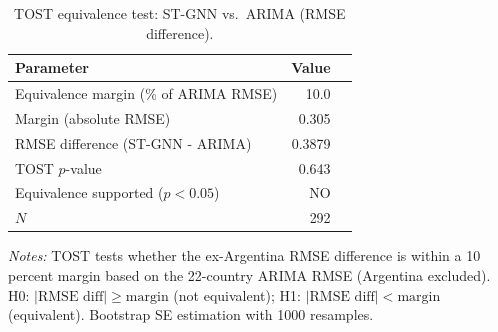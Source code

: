 \begin{table}[ht]
  \centering
  \caption{TOST equivalence test: ST-GNN vs.\ ARIMA (RMSE difference).}
  \label{tab:tost}
  \begin{tabular}{lrr}
    \toprule
    Parameter & Value \\
    \midrule
    Equivalence margin (\% of ARIMA RMSE) & 10.0\\
    Margin (absolute RMSE) & 0.305\\
    RMSE difference (ST-GNN - ARIMA) & 0.3879\\
    TOST $p$-value & 0.643\\
    Equivalence supported ($p < 0.05$) & NO\\
    $N$ & 292\\
    \bottomrule
  \end{tabular}
  \vspace{0.5em}
  \begin{minipage}{\linewidth}
    \footnotesize
    \textit{Notes:} TOST tests whether the ex-Argentina RMSE difference is within a 10 percent margin based on the 22-country ARIMA RMSE (Argentina excluded).
    H0: $|\text{RMSE diff}| \geq \text{margin}$ (not equivalent); H1: $|\text{RMSE diff}| < \text{margin}$ (equivalent).
    Bootstrap SE estimation with 1000 resamples.
  \end{minipage}
\end{table}